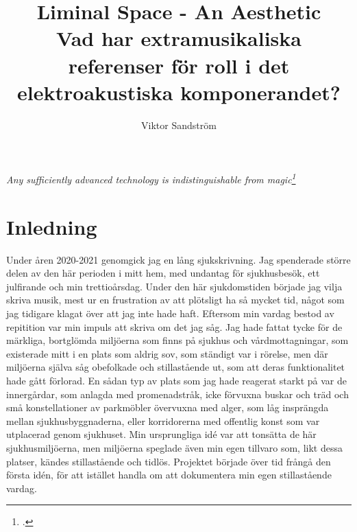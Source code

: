 \documentclass{article}
\title{%
	Liminal Space - An Aesthetic \\
	\large{Vad har extramusikaliska referenser för roll i det elektroakustiska komponerandet?}
}
\author{Viktor Sandström}
\begin{document}
\maketitle
\newpage
\tableofcontents
\newpage



\begin{center}
	\hspace{0pt}
	\vfill
	\emph{Any sufficiently advanced technology is indistinguishable from magic\footcite{ArthurCClarkeMagic}}
	\vfill
	\hspace{0pt}
\end{center}
\newpage

\section{Inledning}
Under åren 2020-2021 genomgick jag en lång sjukskrivning. Jag spenderade större delen av den här perioden i
mitt hem, med undantag för sjukhusbesök, ett julfirande och min trettioårsdag. Under den här sjukdomstiden
började jag vilja skriva musik, mest ur en frustration av att plötsligt ha så mycket tid, något som jag tidigare
klagat över att jag inte hade haft. Eftersom min vardag bestod av repitition var min impuls att skriva om det jag
såg. Jag hade fattat tycke för de märkliga, bortglömda miljöerna som finns på sjukhus och vårdmottagningar,
som existerade mitt i en plats som aldrig sov, som ständigt var i rörelse, men där miljöerna själva såg
obefolkade och stillastående ut, som att deras funktionalitet hade gått förlorad. En sådan typ av plats som
jag hade reagerat starkt på var de innergårdar, som anlagda med promenadstråk, icke förvuxna buskar och träd
och små konstellationer av parkmöbler övervuxna med alger, som låg insprängda mellan sjukhusbyggnaderna, eller
korridorerna med offentlig konst som var utplacerad genom sjukhuset. Min ursprungliga idé var att tonsätta de
här sjukhusmiljöerna, men miljöerna speglade även min egen tillvaro som, likt dessa platser, kändes
stillastående och tidlös. Projektet började över tid frångå den första idén, för att istället handla om att
dokumentera min egen stillastående vardag.
\end{document}
